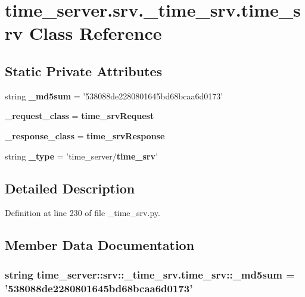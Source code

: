 \section{time\-\_\-server.\-srv.\-\_\-time\-\_\-srv.\-time\-\_\-srv \-Class \-Reference}
\label{classtime__server_1_1srv_1_1__time__srv_1_1time__srv}
\subsection*{\-Static \-Private \-Attributes}
\begin{DoxyCompactItemize}
\item 
string {\bf \-\_\-md5sum} = '538088de2280801645bd68bcaa6d0173'
\item 
{\bf \-\_\-request\-\_\-class} = {\bf time\-\_\-srv\-Request}
\item 
{\bf \-\_\-response\-\_\-class} = {\bf time\-\_\-srv\-Response}
\item 
string {\bf \-\_\-type} = 'time\-\_\-server/{\bf time\-\_\-srv}'
\end{DoxyCompactItemize}


\subsection{\-Detailed \-Description}


\-Definition at line 230 of file \-\_\-time\-\_\-srv.\-py.



\subsection{\-Member \-Data \-Documentation}
\subsubsection[{\-\_\-md5sum}]{\setlength{\rightskip}{0pt plus 5cm}string {\bf time\-\_\-server\-::srv\-::\-\_\-time\-\_\-srv.\-time\-\_\-srv\-::\-\_\-md5sum} = '538088de2280801645bd68bcaa6d0173'\hspace{0.3cm}{\ttfamily  [static, private]}}\label{classtime__server_1_1srv_1_1__time__srv_1_1time__srv_a6e6b0c68d1620ae74910db11351ee2d0}


